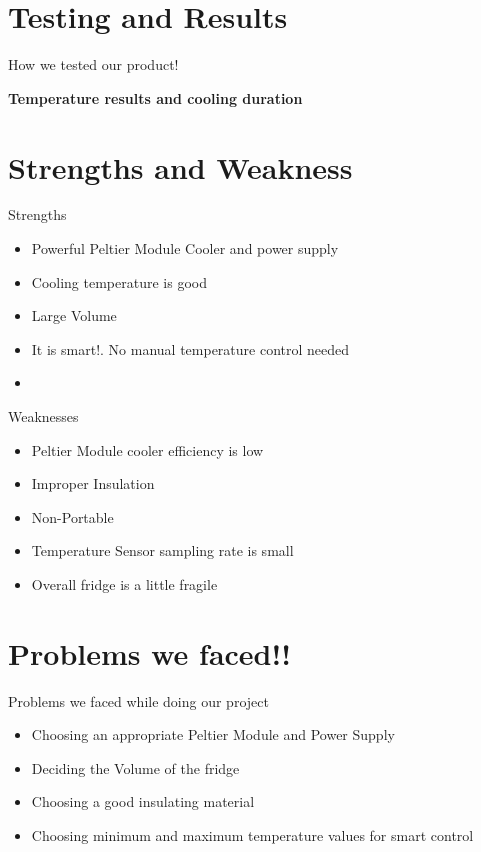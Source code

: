 \documentclass[10pt]{beamer}
\begin{document}
{\section{Testing and Results}
{
	\begin{frame}{How we tested our product!}
		\begin{center}
			\begin{alertblock}{
					\bfseries{Temperature results and cooling duration\\}}
			\end{alertblock}
		\end{center}
	\end{frame}
}

\section{Strengths and Weakness}
{
	\begin{frame}{Strengths}
		\begin{itemize}[<+- | alert@+>]
			\item Powerful Peltier Module Cooler and power supply
			\item Cooling temperature is good
			\item Large Volume
			\item It is smart!. No manual temperature control needed
			\item 
		\end{itemize}
	\end{frame}
}
{
	\begin{frame}{Weaknesses}
		\begin{itemize}[<+- | alert@+>]
			\item Peltier Module cooler efficiency is low
			\item Improper Insulation
			\item Non-Portable
			\item Temperature Sensor sampling rate is small
			\item Overall fridge is a little fragile
		\end{itemize}
	\end{frame}
}
\section{Problems we faced!!}
{
	\begin{frame}{Problems we faced while doing our project}
		\begin{itemize}
			\item Choosing an appropriate Peltier Module and Power Supply
			\item Deciding the Volume of the fridge
			\item Choosing a good insulating material
			\item Choosing minimum and maximum temperature values for smart control
		\end{itemize}
	\end{frame}
}
}
\end{document}
